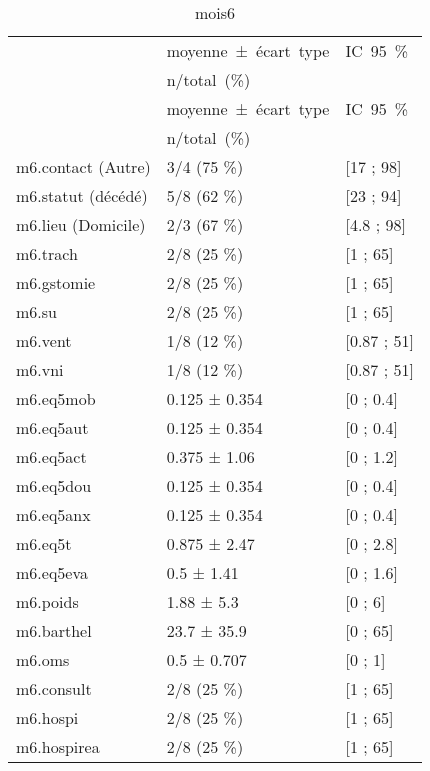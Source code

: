 \documentclass[]{article}
\begin{document}
\begin{longtable}{lll}
  \toprule
  
                                                &\mbox{moyenne ± écart type}&\mbox{IC 95 \%}\\
                                                &\mbox{n/total (\%)}&\\
                                                \midrule
                                                \endfirsthead
                                                \midrule
                                                &\mbox{moyenne ± écart type}&\mbox{IC 95 \%}\\
                                                &\mbox{n/total (\%)}&\\
                                                \midrule
                                                \endhead
                                                \bottomrule
                                                \endfoot
                                                \bottomrule
                                                \caption{mois6}
                                                \label{tabdmois6}
                                                \endlastfoot
                                                m6.contact (Autre) & 3/4 (75 \%) &  [17 ; 98] \\ 
  m6.statut (décédé) & 5/8 (62 \%) &  [23 ; 94] \\ 
  m6.lieu (Domicile) & 2/3 (67 \%) &  [4.8 ; 98] \\ 
  m6.trach & 2/8 (25 \%) &  [1 ; 65] \\ 
  m6.gstomie & 2/8 (25 \%) &  [1 ; 65] \\ 
  m6.su & 2/8 (25 \%) &  [1 ; 65] \\ 
  m6.vent & 1/8 (12 \%) &  [0.87 ; 51] \\ 
  m6.vni & 1/8 (12 \%) &  [0.87 ; 51] \\ 
  m6.eq5mob & 0.125 ± 0.354 & [0 ; 0.4] \\ 
  m6.eq5aut & 0.125 ± 0.354 & [0 ; 0.4] \\ 
  m6.eq5act & 0.375 ± 1.06 & [0 ; 1.2] \\ 
  m6.eq5dou & 0.125 ± 0.354 & [0 ; 0.4] \\ 
  m6.eq5anx & 0.125 ± 0.354 & [0 ; 0.4] \\ 
  m6.eq5t & 0.875 ± 2.47 & [0 ; 2.8] \\ 
  m6.eq5eva & 0.5 ± 1.41 & [0 ; 1.6] \\ 
  m6.poids & 1.88 ± 5.3 & [0 ; 6] \\ 
  m6.barthel & 23.7 ± 35.9 & [0 ; 65] \\ 
  m6.oms & 0.5 ± 0.707 & [0 ; 1] \\ 
  m6.consult & 2/8 (25 \%) &  [1 ; 65] \\ 
  m6.hospi & 2/8 (25 \%) &  [1 ; 65] \\ 
  m6.hospirea & 2/8 (25 \%) &  [1 ; 65] \\ 
  \end{longtable}
\end{document}
